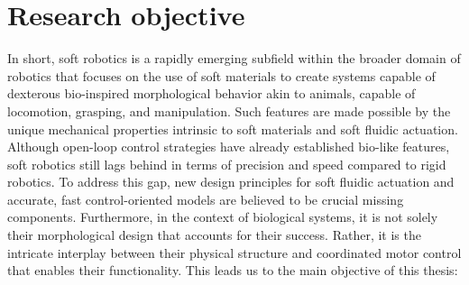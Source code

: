 \vspace{-3mm}
\section{Research objective}
In short, soft robotics is a rapidly emerging subfield within the broader domain of robotics that focuses on the use of soft materials to create systems capable of dexterous bio-inspired morphological behavior akin to animals, capable of locomotion, grasping, and manipulation. Such features are made possible by the unique mechanical properties intrinsic to soft materials and soft fluidic actuation. Although open-loop control strategies have already established bio-like features, soft robotics still lags behind in terms of precision and speed compared to rigid robotics. To address this gap, new design principles for soft fluidic actuation and accurate, fast control-oriented models are believed to be crucial missing components. Furthermore, in the context of biological systems, it is not solely their morphological design that accounts for their success. Rather, it is the intricate interplay between their physical structure and coordinated motor control that enables their functionality. This leads us to the main objective of this thesis:

